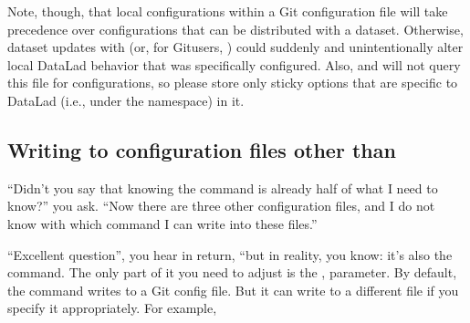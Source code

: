 \sphinxAtStartPar
Note, though, that local configurations within a Git configuration file
will take precedence over configurations that can be distributed with a dataset.
Otherwise, dataset updates with  (or, for Git\sphinxhyphen{}users,
) could suddenly and unintentionally alter local DataLad
behavior that was specifically configured.
Also, {\hyperref[\detokenize{glossary:term-Git}]{}} and {\hyperref[\detokenize{glossary:term-git-annex}]{}} will not query this file for configurations, so please store only sticky options that are specific to DataLad (i.e., under the  namespace) in it.

\ignorespaces 

\subsection{Writing to configuration files other than }
\label{\detokenize{basics/101-123-config2:writing-to-configuration-files-other-than-git-config}}\label{\detokenize{basics/101-123-config2:index-4}}
\sphinxAtStartPar
“Didn’t you say that knowing the  command is already
half of what I need to know?” you ask. “Now there are three other configuration
files, and I do not know with which command I can write into these files.”

\sphinxAtStartPar
“Excellent question”, you hear in return, “but in reality, you  know:
it’s also the  command. The only part of it you need to
adjust is the ,  parameter. By default, the command writes to
a Git config file. But it can write to a different file if you specify it
appropriately. For example,
\begin{quote}

\sphinxAtStartPar
{}
\end{quote}

